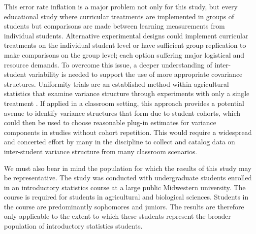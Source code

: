 \documentclass[11pt]{isuthesis}\usepackage[]{graphicx}\usepackage[]{color}
\newcommand{\km}[1]{{\color{red} #1}}
\begin{document}
\km{This error rate inflation is a major problem not only for this study, but every educational study where curricular treatments are implemented in groups of students but comparisons are made between learning measurements from individual students. Alternative experimental designs could implement curricular treatments on the individual student level or have sufficient group replication to make comparisons on the group level; each option suffering major logistical and resource demands. To overcome this issue, a deeper understanding of inter-student variability is needed to support the use of more appropriate covariance structures. Uniformity trials are an established method within agricultural statistics that examine variance structure through experiments with only a single treatment \citep{richter2012geostatistical}. If applied in a classroom setting, this approach provides a potential avenue to identify variance structures that form due to student cohorts, which could then be used to choose reasonable plug-in estimates for variance components in studies without cohort repetition. This would require a widespread and concerted effort by many in the discipline to collect and catalog data on inter-student variance structure from many classroom scenarios. }

We must also bear in mind the population for which the results of this study may be representative. The study was conducted with undergraduate students enrolled in an introductory statistics course at a large public Midwestern university.  The course is required for students in agricultural and biological sciences.  Students in the course are predominantly sophomores and juniors. The results are therefore only applicable to the extent to which these students represent the broader population of introductory statistics students.

\end{document}
